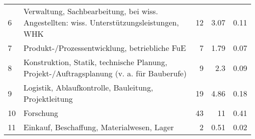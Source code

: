 \begin{longtable}{lXrrr}
     6 &
     \multicolumn{1}{X}{ Verwaltung, Sachbearbeitung, bei wiss. Angestellten: wiss. Unterstützungsleistungen, WHK   } &


       \num{12} &
       \num[round-mode=places,round-precision=2]{3,07} &
         \num[round-mode=places,round-precision=2]{0,11} \\

     7 &
     \multicolumn{1}{X}{ Produkt-/Prozessentwicklung, betriebliche FuE   } &


       \num{7} &
       \num[round-mode=places,round-precision=2]{1,79} &
         \num[round-mode=places,round-precision=2]{0,07} \\

     8 &
     \multicolumn{1}{X}{ Konstruktion, Statik, technische Planung, Projekt-/Auftragsplanung (v. a. für Bauberufe)   } &


       \num{9} &
       \num[round-mode=places,round-precision=2]{2,3} &
         \num[round-mode=places,round-precision=2]{0,09} \\

     9 &
     \multicolumn{1}{X}{ Logistik, Ablaufkontrolle, Bauleitung, Projektleitung   } &


       \num{19} &
       \num[round-mode=places,round-precision=2]{4,86} &
         \num[round-mode=places,round-precision=2]{0,18} \\

     10 &
     \multicolumn{1}{X}{ Forschung   } &


       \num{43} &
       \num[round-mode=places,round-precision=2]{11} &
         \num[round-mode=places,round-precision=2]{0,41} \\

     11 &
     \multicolumn{1}{X}{ Einkauf, Beschaffung, Materialwesen, Lager   } &


       \num{2} &
       \num[round-mode=places,round-precision=2]{0,51} &
         \num[round-mode=places,round-precision=2]{0,02} \\


\end{longtable}
